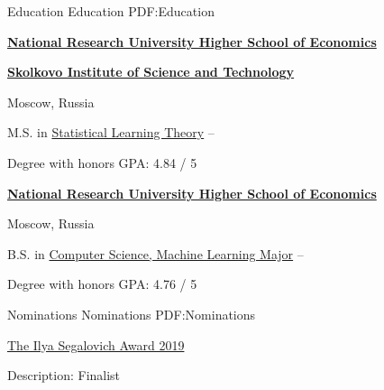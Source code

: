 \documentclass[letterpaper,MMMyyyy,nonstopmode]{simpleresumecv}
\begin{document}
\begin{Body}

\Section
{Education}
{Education}
{PDF:Education}

\iffalse
\Entry
\href{https://www.hse.ru/en/}
{\textbf{National Research University Higher School of Economics}}
\par
Moscow, Russia

\Gap
\BulletItem
Ph.D. in
\href{https://aspirantura.hse.ru/en/cs/}
{Computer Science}
\hfill
\DatestampY{2020} --
Present
\begin{Detail}
\SubBulletItem
Scientific supervisor: \href{https://www.hse.ru/en/staff/dvetrov}{Dmitry Vetrov}
\SubBulletItem
Thesis: Monte Carlo Gradient Estimation for Discrete Latent Variable Models
\end{Detail}
\Gap
\fi

\Entry
\href{https://www.hse.ru/en/}
{\textbf{National Research University Higher School of Economics}}
\par
\href{https://www.skoltech.ru/en/}{\textbf{Skolkovo Institute of Science and Technology}}
\par
Moscow, Russia

\Gap
\BulletItem
M.S. in
\href{https://www.hse.ru/en/ma/sltheory/}
{Statistical Learning Theory}
\hfill
{} --
\begin{Detail}
\SubBulletItem
Degree with honors
\SubBulletItem
GPA: 4.84 / 5
\end{Detail}
\Gap

\Entry
\href{https://www.hse.ru/en/}
{\textbf{National Research University Higher School of Economics}}
\par
Moscow, Russia

\Gap
\BulletItem
B.S. in
\href{https://www.hse.ru/en/ba/ami/}
{Computer Science, Machine Learning Major}
\hfill
{} --
\begin{Detail}
\SubBulletItem
Degree with honors
\SubBulletItem
GPA: 4.76 / 5
\end{Detail}



\Section
{Nominations}
{Nominations}
{PDF:Nominations}

\BulletItem
\href{https://cs.hse.ru/en/stipend/}{The Ilya Segalovich Award 2019}
\begin{Detail}
\Item
Description: Finalist
\end{Detail}


\end{Body}
\end{document}
